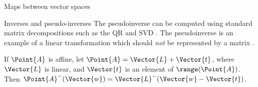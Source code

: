 \begin{plSection}{Maps between vector spaces}
\begin{plSection}{Inverses and pseudo-inverses}
The pseudoinverse can be computed
using standard matrix decompositions such as
the QR and SVD \cite{GolubVanLoan:1996}.
The pseudoinverse is an example of a linear transformation
which should {\em not} be represented by a matrix
\cite{McDonald:1989:OOPSLA}.

If $\Point{A}$ is affine,
let $\Point{A} = \Vector{L} + \Vector{t}$,
where $\Vector{L}$ is linear,
and $\Vector{t}$ is an element of $\range(\Point{A})$.
Then $\Point{A}^{-}(\Vector{w}) = 
\Vector{L}^{-}( \Vector{w} - \Vector{t} )$.

\end{plSection}%
\end{plSection}%


